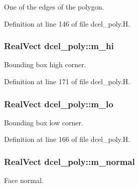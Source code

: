 One of the edges of the polygon. 



Definition at line 146 of file dcel\+\_\+poly.\+H.

\subsubsection[{\texorpdfstring{m\+\_\+hi}{m_hi}}]{\setlength{\rightskip}{0pt plus 5cm}Real\+Vect dcel\+\_\+poly\+::m\+\_\+hi\hspace{0.3cm}{\ttfamily [protected]}}\hypertarget{classdcel__poly_a3015b73d27f5ff15a9f58438816c4e9b}{}\label{classdcel__poly_a3015b73d27f5ff15a9f58438816c4e9b}


Bounding box high corner. 



Definition at line 171 of file dcel\+\_\+poly.\+H.

\subsubsection[{\texorpdfstring{m\+\_\+lo}{m_lo}}]{\setlength{\rightskip}{0pt plus 5cm}Real\+Vect dcel\+\_\+poly\+::m\+\_\+lo\hspace{0.3cm}{\ttfamily [protected]}}\hypertarget{classdcel__poly_acfbac42d8308ca183ac0b9b67f0994d7}{}\label{classdcel__poly_acfbac42d8308ca183ac0b9b67f0994d7}


Bounding box low corner. 



Definition at line 166 of file dcel\+\_\+poly.\+H.

\subsubsection[{\texorpdfstring{m\+\_\+normal}{m_normal}}]{\setlength{\rightskip}{0pt plus 5cm}Real\+Vect dcel\+\_\+poly\+::m\+\_\+normal\hspace{0.3cm}{\ttfamily [protected]}}\hypertarget{classdcel__poly_ac11d42f1a19dc3d289aea11c8d7ce360}{}\label{classdcel__poly_ac11d42f1a19dc3d289aea11c8d7ce360}


Face normal. 



